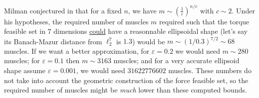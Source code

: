 Milman conjectured in \cite{milmanDvoretzkyTheoremThirtyYearsLater1992} that for a fixed $n$, we have $m\sim \left(\frac{1}{\varepsilon}\right)^{n/c}$ with $c\sim 2$. Under his hypotheses, the required number of muscles $m$ required such that the torque feasible set in $7$ dimensions \underline{could} have a reasonnable ellipsoidal shape (let's say its Banach-Mazur distance from $\ell_2^7$ is $1.3$) would be $m \sim (1/0.3)^{7/2} \sim 68$ muscles. If we want a better approximation, for $\varepsilon = 0.2$ we would need $m\sim 280$ muscles; for $\varepsilon = 0.1$ then $m\sim 3163$ muscles; and for a very accurate ellipsoid shape assume $\varepsilon = 0.001$, we would need $31622776602$ muscles. These numbers do not take into account the geometric construction of the force feasible set, so the required number of muscles might be \emph{much} lower than these computed bounds.

